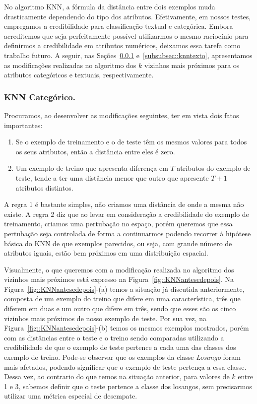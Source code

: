 No algoritmo \textsc{KNN}, a fórmula da distância entre dois exemplos muda drasticamente dependendo do tipo dos atributos.
Efetivamente, em nossos testes, empregamos a credibilidade para classificação textual e categórica. Embora acreditemos que seja perfeitamente possível utilizarmos o mesmo raciocínio para definirmos a credibilidade em atributos numéricos, deixamos essa tarefa como trabalho futuro. A seguir, nas Seções~\ref{subsubsec::knncat} e~\ref{subsubsec::knntexto}, apresentamos as modificações realizadas no algoritmo dos $k$ vizinhos mais próximos para os atributos categóricos e textuais, respectivamente.

\subsubsection{\textsc{KNN} Categórico.}
\label{subsubsec::knncat}

Procuramos, ao desenvolver as modificações seguintes, ter em vista dois fatos importantes:
\begin{enumerate}
\item Se o exemplo de treinamento e o de teste têm os mesmos valores para todos os seus atributos, então a distância entre eles é zero. 
\item Um exemplo de treino que apresenta diferença em $T$ atributos do exemplo de teste, tende a ter uma distância menor que outro que apresente $T+1$ atributos distintos.
\end{enumerate}

A regra 1 é bastante simples, não criamos uma distância de onde a mesma não existe. A regra 2 diz que ao levar em consideração a credibilidade do exemplo de treinamento, criamos uma pertubação no espaço, porém queremos que essa pertubação seja controlada de forma a continuarmos podendo recorrer à hipótese básica do \textsc{KNN} de que exemplos parecidos, ou seja, com grande número de atributos iguais, estão bem próximos em uma distribuição espacial.

Visualmente, o que queremos com a modificação realizada no algoritmo dos vizinhos mais próximos está expresso na Figura~\ref{fig::KNNantesedepois}. Na Figura~\ref{fig::KNNantesedepois}-(a) temos a situação já discutida anteriormente, composta de um exemplo do treino que difere em uma característica, três que diferem em duas e um outro que difere em três, sendo que esses são os cinco vizinhos mais próximos de nosso exemplo de teste. Por sua vez, na Figura~\ref{fig::KNNantesedepois}-(b) temos os mesmos exemplos mostrados, porém com as distâncias entre o teste e o treino sendo comparadas utilizando a credibilidade de que o exemplo de teste pertence a cada uma das classes dos exemplo de treino. 
Pode-se observar que os exemplos da classe \textit{Losango} foram mais afetados, podendo significar que o exemplo de teste pertença a essa classe. Dessa vez, ao contrario do que temos na situação anterior, para valores de $k$ entre 1 e 3, sabemos definir que o teste pertence a classe dos losangos, sem precisarmos utilizar uma métrica especial de desempate. 

